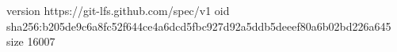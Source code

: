version https://git-lfs.github.com/spec/v1
oid sha256:b205de9c6a8fc52f644ce4a6dcd5fbc927d92a5ddb5deeef80a6b02bd226a645
size 16007
